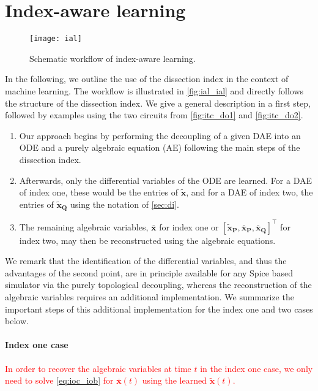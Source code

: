 \documentclass[AMA,STIX1COL]{WileyNJD-v2}
\newcommand{\mb}[1]{\mathbf{#1}}
\newcommand{\mbt}[1]{\tilde{\mathbf{#1}}}
\newcommand{\mbb}[1]{\bar{\mathbf{#1}}}
\newcommand{\T}{{\!\top}}
\begin{document}
\section{Index-aware learning}
\label{sec:ial}
\begin{figure}[b]
    \begin{center}
        \texttt{[image: ial]}
    \end{center}
    \caption{Schematic workflow of index-aware learning.}
    \label{fig:ial_ial}
\end{figure}
In the following, we outline the use of the dissection index in the context of machine learning. The workflow is illustrated in \autoref{fig:ial_ial} and directly follows the structure of the dissection index. We give a general description in a first step, followed by examples using the two circuits from \autoref{fig:itc_do1} and \autoref{fig:itc_do2}.
\begin{enumerate}
    \item Our approach begins by performing the decoupling of a given DAE into an ODE and a purely algebraic equation (AE) following the main steps of the dissection index.
    \item Afterwards, only the differential variables of the ODE are learned. For a DAE of index one, these would be the entries of $\mbt{x}$, and for a DAE of index two, the entries of $\mbt{x}_\mb{Q}$ using the notation of \autoref{sec:di}.
    \item The remaining algebraic variables, $\mbb{x}$ for index one or $[\mbt{x}_\mb{P}, \mbb{x}_\mb{P}, \mbb{x}_\mb{Q}]^\T$ for index two, may then be reconstructed using the algebraic equations.
\end{enumerate}
We remark that the identification of the differential variables, and thus the advantages of the second point, are in principle available for any Spice based simulator via the purely topological decoupling\cite{jansen2014}, whereas the reconstruction of the algebraic variables requires an additional implementation. We summarize the important steps of this additional implementation for the index one and two cases below.

\paragraph{Index one case}
\textcolor{red}{In order to recover the algebraic variables at time $t$ in the index one case, we only need to solve \eqref{eq:ioc_iob} for $\mbb{x}(t)$ using the learned $\mbt{x}(t)$.}
\end{document}
